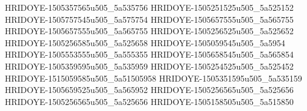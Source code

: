 HRIDOYE-1505357565u505_5a535756
HRIDOYE-1505251525u505_5a525152
HRIDOYE-1505757545u505_5a575754
HRIDOYE-1505657555u505_5a565755
HRIDOYE-1505657555u505_5a565755
HRIDOYE-1505256525u505_5a525652
HRIDOYE-1505256585u505_5a525658
HRIDOYE-1505059545u505_5a5954
HRIDOYE-1505553555u505_5a555355
HRIDOYE-1505658545u505_5a565854
HRIDOYE-1505359595u505_5a535959
HRIDOYE-1505254525u505_5a525452
HRIDOYE-1515059585u505_5a51505958
HRIDOYE-1505351595u505_5a535159
HRIDOYE-1505659525u505_5a565952
HRIDOYE-1505256565u505_5a525656
HRIDOYE-1505256565u505_5a525656
HRIDOYE-1505158505u505_5a515850
